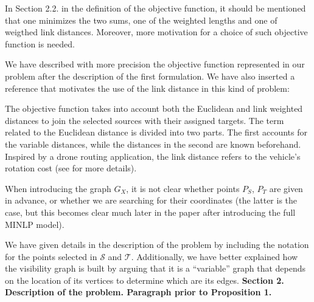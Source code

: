 \documentclass{article}
\newenvironment{reviewer}{\setcounter{pointcounter}{1}}{}
\newcommand{\point}{\text{{\selectfont \thepointcounter} \stepcounter{pointcounter}}}
\begin{document}
\begin{reviewer}
		\begin{itshape}
			In Section 2.2. in the definition of the objective function, it should be mentioned that one minimizes the two sums, one of the weighted lengths and one of weigthed link distances. Moreover, more motivation for a choice of such objective function is needed.
		\end{itshape}
		
		\begin{tcolorbox}[breakable,enhanced,coltitle=black,colback=green!5!white,colframe=green!75!black,title=\textbf{Answer R2.\point},borderline={1pt}{0pt}{black},boxrule=0pt]
			We have described with more precision the objective function represented in our problem after the description of the first formulation. We have also inserted a reference that motivates the use of the link distance in this kind of problem:\medskip
			
			The objective function takes into account both the Euclidean and link weighted distances to join the selected sources with their assigned targets. The term related to the Euclidean distance is divided into two parts. The first accounts for the variable distances, while the distances in the second are known beforehand. Inspired by a drone routing application, the link distance refers to the vehicle's rotation cost (see \cite{maheshwari2000} for more details).
			
		\end{tcolorbox}
	
		\begin{itshape}
			When introducing the graph $G_X$, it is not clear whether points $P_S$, $P_T$ are given in advance, or whether we are searching for their coordinates (the latter is the case, but this becomes clear much later in the paper after introducing the full MINLP model). 
		\end{itshape}
	
		\begin{tcolorbox}[breakable,enhanced,coltitle=black,colback=green!5!white,colframe=green!75!black,title=\textbf{Answer R2.\point},borderline={1pt}{0pt}{black},boxrule=0pt]
			We have given details in the description of the problem by including the notation for the points selected in $\mathcal S$ and $\mathcal T$. Additionally, we have better explained how the visibility graph is built by arguing that it is a ``variable'' graph that depends on the location of its vertices to determine which are its edges. \textbf{Section 2. Description of the problem. Paragraph prior to Proposition 1.}
		\end{tcolorbox}
		

\end{reviewer}
\end{document}

